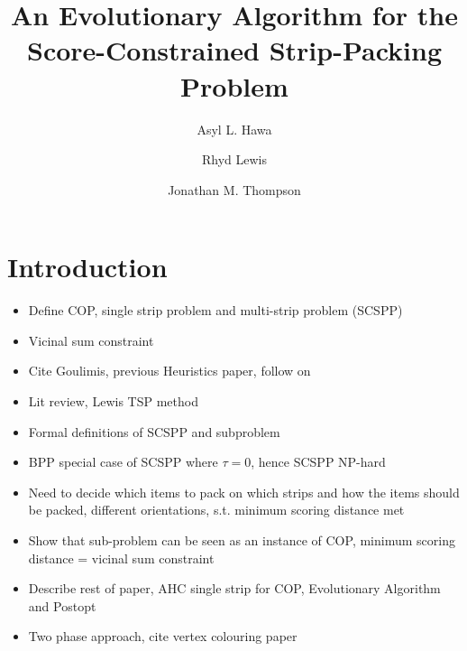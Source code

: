\documentclass{elsarticle}
\begin{document}
	
\begin{frontmatter}
\title{An Evolutionary Algorithm for the Score-Constrained Strip-Packing Problem}
\author{Asyl L. Hawa}
\author{Rhyd Lewis}
\author{Jonathan M. Thompson}
\address{School of Mathematics, Cardiff University, Senghennydd Road, Cardiff, UK}

\begin{abstract}

\end{abstract}	

\end{frontmatter}


\section{Introduction}
\begin{itemize}
	\item Define COP, single strip problem and multi-strip problem (SCSPP)
	\item Vicinal sum constraint
	\item Cite Goulimis, previous Heuristics paper, follow on
	\item Lit review, Lewis TSP method
	\item Formal definitions of SCSPP and subproblem
	\item BPP special case of SCSPP where $\tau = 0$, hence SCSPP NP-hard
	\item Need to decide which items to pack on which strips and how the items should be packed, different orientations, s.t. minimum scoring distance met
	\item Show that sub-problem can be seen as an instance of COP, minimum scoring distance = vicinal sum constraint
	\item Describe rest of paper, AHC single strip for COP, Evolutionary Algorithm and Postopt
	\item Two phase approach, cite vertex colouring paper
\end{itemize}
\end{document}
